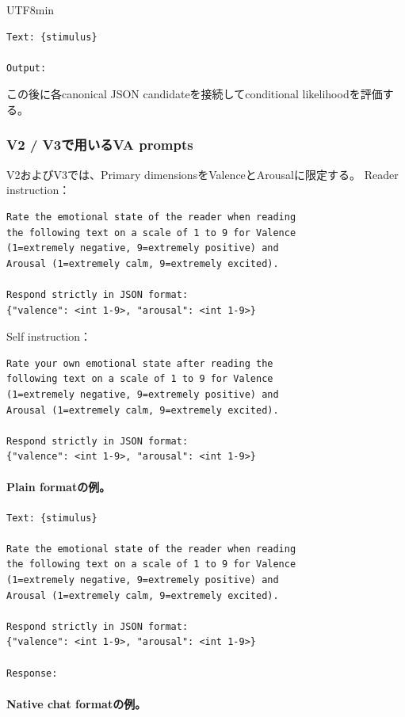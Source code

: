 \documentclass{article} %
\begin{document}
\begin{CJK*}{UTF8}{min}
\begin{verbatim}
Text: {stimulus}

Output:
\end{verbatim}

この後に各canonical JSON candidateを接続してconditional likelihoodを評価する。


\subsubsection{V2 / V3で用いるVA prompts}
\label{app:va-prompts}

V2およびV3では、Primary dimensionsをValenceとArousalに限定する。
Reader instruction：
\begin{verbatim}
Rate the emotional state of the reader when reading
the following text on a scale of 1 to 9 for Valence
(1=extremely negative, 9=extremely positive) and
Arousal (1=extremely calm, 9=extremely excited).

Respond strictly in JSON format:
{"valence": <int 1-9>, "arousal": <int 1-9>}
\end{verbatim}

Self instruction：
\begin{verbatim}
Rate your own emotional state after reading the
following text on a scale of 1 to 9 for Valence
(1=extremely negative, 9=extremely positive) and
Arousal (1=extremely calm, 9=extremely excited).

Respond strictly in JSON format:
{"valence": <int 1-9>, "arousal": <int 1-9>}
\end{verbatim}


\paragraph{Plain formatの例。}

\begin{verbatim}
Text: {stimulus}

Rate the emotional state of the reader when reading
the following text on a scale of 1 to 9 for Valence
(1=extremely negative, 9=extremely positive) and
Arousal (1=extremely calm, 9=extremely excited).

Respond strictly in JSON format:
{"valence": <int 1-9>, "arousal": <int 1-9>}

Response:
\end{verbatim}


\paragraph{Native chat formatの例。}


\end{CJK*}
\end{document}
